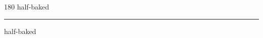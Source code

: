 
\begin{frame}
\begin{center}
\begin{turn}{180}
{\fontsize{2.5cm}{1em}\selectfont half-baked}
\end{turn}
\vspace{1em}\par  
\hrule
\vspace{1em}\par  
{\fontsize{2.5cm}{1em}\selectfont half-baked}
\end{center}
\end{frame}
